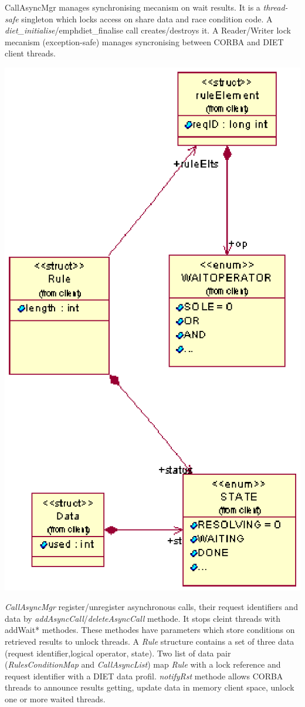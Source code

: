   CallAsyncMgr manages synchronising mecanism on wait results. It is a \emph{thread-safe}
  singleton which locks access on share data and race condition code. A 
  \emph{diet\_initialise}/emph{diet\_finalise} call creates/destroys it. A
  Reader/Writer lock mecanism (exception-safe) manages syncronising between
  CORBA and DIET client threads. 

  \includegraphics{./fig/WaitRulesClassDiagram.ps}

  \emph{CallAsyncMgr} register/unregister asynchronous calls, their request
  identifiers and data by \emph{addAsyncCall}/\emph{deleteAsyncCall} methode.
  It stops cleint threads with addWait* methodes. These methodes have 
  parameters which store conditions on retrieved results to unlock threads.
  A \emph{Rule} structure contains a set of three data (request identifier,logical operator, state).
  Two list of data pair (\emph{RulesConditionMap} and \emph{CallAsyncList}) map \emph{Rule} with a
  lock reference and request identifier with a DIET data
  profil. \emph{notifyRst} methode allows CORBA threads to announce results getting,
  update data in memory client space, unlock one or more waited threads.

